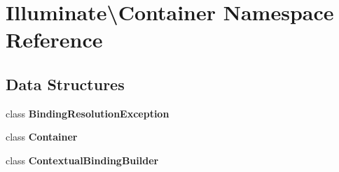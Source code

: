 \section{Illuminate\textbackslash{}Container Namespace Reference}
\label{namespace_illuminate_1_1_container}
\subsection*{Data Structures}
\begin{DoxyCompactItemize}
\item 
class {\bf Binding\+Resolution\+Exception}
\item 
class {\bf Container}
\item 
class {\bf Contextual\+Binding\+Builder}
\end{DoxyCompactItemize}
